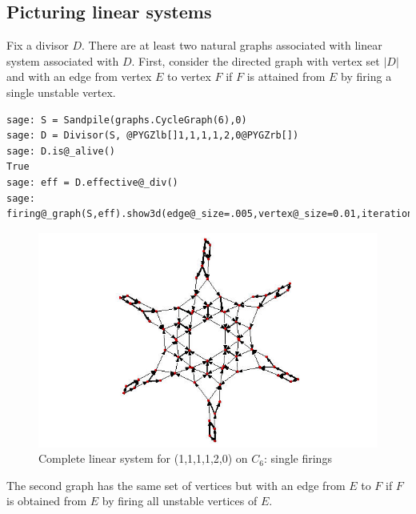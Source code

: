 \documentclass[letterpaper,10pt,english]{manual}
\begin{document}
\subsection{Picturing linear systems}

Fix a divisor $D$.  There are at least two natural graphs associated with
linear system associated with $D$.  First, consider the directed graph with
vertex set $|D|$ and with an edge from vertex $E$ to vertex $F$ if $F$ is
attained from $E$ by firing a single unstable vertex.

\begin{Verbatim}[commandchars=@\[\]]
sage: S = Sandpile(graphs.CycleGraph(6),0)
sage: D = Divisor(S, @PYGZlb[]1,1,1,1,2,0@PYGZrb[])
sage: D.is@_alive()
True
sage: eff = D.effective@_div()
sage:
firing@_graph(S,eff).show3d(edge@_size=.005,vertex@_size=0.01,iterations=500)
\end{Verbatim}
\begin{figure}[htbp]
\centering

\includegraphics{C_6.png}
\caption{Complete linear system for (1,1,1,1,2,0) on $C_6$: single firings}\end{figure}

The second graph has the same set of vertices but with an edge from $E$ to $F$
if $F$ is obtained from $E$ by firing all unstable vertices of $E$.
\end{document}
